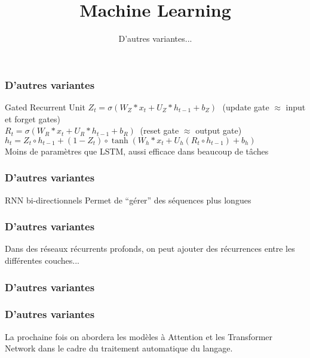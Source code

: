 \documentclass{formation}
\title{Machine Learning}
\subtitle{D'autres variantes...}
\begin{document}
\maketitle

\begin{frame}
  \frametitle{D'autres variantes}
  Gated Recurrent Unit
  $Z_{t}=\sigma (W_{Z}*x_{t}+U_{Z}*h_{t-1}+b_{Z})\,\,\,\,$(update gate $\approx$ input et forget gates) \\
  $R_{t}=\sigma (W_{R}*x_{t}+U_{R}*h_{t-1}+b_{R})\;\;$(reset gate $\approx$ output gate) \\
  $h_{t}=Z_{t}\circ h_{t-1}+(1-Z_{t})\circ \tanh(W_{h}*x_{t}+U_{h}(R_{t}\circ h_{t-1})+b_{h})$ \\
  Moins de paramètres que LSTM, aussi efficace dans beaucoup de tâches
\end{frame}

\begin{frame}
  \frametitle{D'autres variantes}
  RNN bi-directionnels
  Permet de ``gérer'' des séquences plus longues
\end{frame}

\begin{frame}
  \frametitle{D'autres variantes}
  Dans des réseaux récurrents profonds, on peut ajouter des récurrences entre les différentes couches... \\
\end{frame}

\begin{frame}
  \frametitle{D'autres variantes}
\end{frame}

\begin{frame}
  \frametitle{D'autres variantes}
  La prochaine fois on abordera les modèles à Attention et les Transformer Network dans le cadre du traitement automatique du langage.
\end{frame}
\end{document}
